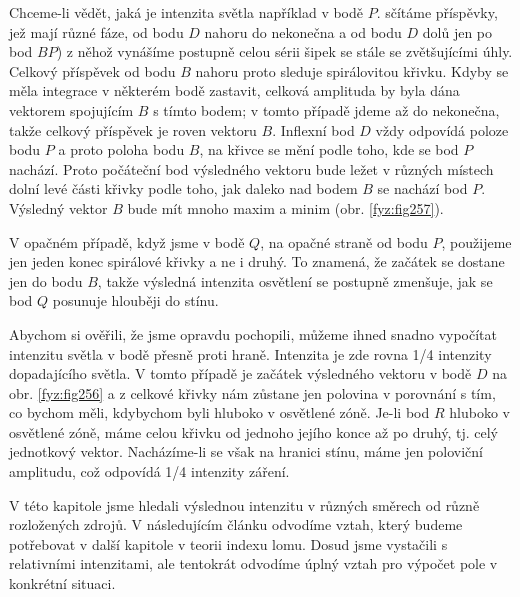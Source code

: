 {    Chceme-li vědět, jaká je intenzita světla například v bodě \(P\). sčítáme příspěvky, jež mají 
    různé fáze, od bodu \(D\) nahoru do nekonečna a od bodu \(D\) dolů jen po bod \(BP\)) z něhož 
    vynášíme postupně celou sérii šipek se stále se zvětšujícími úhly. Celkový příspěvek od bodu 
    \(B\) nahoru proto sleduje spirálovitou křivku. Kdyby se měla integrace v některém bodě 
    zastavit, celková amplituda by byla dána vektorem spojujícím \(B\) s tímto bodem; v tomto 
    případě jdeme až do nekonečna, takže celkový příspěvek je roven vektoru \(B\). Inflexní bod 
    \(D\) vždy odpovídá poloze bodu \(P\) a proto poloha bodu \(B\), na křivce se mění podle toho, 
    kde se bod \(P\) nachází. Proto počáteční bod výsledného vektoru bude ležet v různých místech 
    dolní levé části křivky podle toho, jak daleko nad bodem \(B\) se nachází bod \(P\). Výsledný 
    vektor \(B\) bude mít mnoho maxim a minim (obr. \ref{fyz:fig257}).
    
    
    V opačném případě, když jsme v bodě \(Q\), na opačné straně od bodu \(P\), použijeme jen jeden 
    konec spirálové křivky a ne i druhý. To znamená, že začátek se dostane jen do bodu \(B\), takže 
    výsledná intenzita osvětlení se postupně zmenšuje, jak se bod \(Q\) posunuje hlouběji do stínu.
    
    Abychom si ověřili, že jsme opravdu pochopili, můžeme ihned snadno vypočítat intenzitu světla v 
    bodě přesně proti hraně. Intenzita je zde rovna \num{1/4} intenzity dopadajícího světla. V 
    tomto případě je začátek výsledného vektoru v bodě \(D\) na obr. \ref{fyz:fig256} a z celkové 
    křivky nám zůstane jen polovina v porovnání s tím, co bychom měli, kdybychom byli hluboko v 
    osvětlené zóně. Je-li bod \(R\) hluboko v osvětlené zóně, máme celou křivku od jednoho jejího 
    konce až po druhý, tj. celý jednotkový vektor. Nacházíme-li se však na hranici stínu, máme jen 
    poloviční amplitudu, což odpovídá \num{1/4} intenzity záření.
    
    V této kapitole jsme hledali výslednou intenzitu v různých směrech od různě rozložených zdrojů. 
    V následujícím článku odvodíme vztah, který budeme potřebovat v další kapitole v teorii indexu 
    lomu. Dosud jsme vystačili s relativními intenzitami, ale tentokrát odvodíme úplný vztah pro 
    výpočet pole v konkrétní situaci.
    
}
